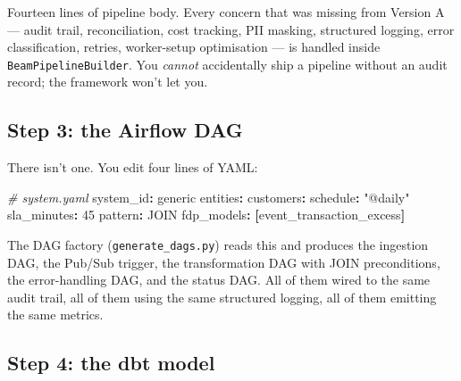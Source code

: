 \documentclass[
  11pt,
  british,
  oneside]{book}
\newenvironment{Shaded}{\begin{snugshade}}{\end{snugshade}}
\newcommand{\AttributeTok}[1]{\textcolor[rgb]{0.77,0.63,0.00}{#1}}
\newcommand{\CommentTok}[1]{\textcolor[rgb]{0.56,0.35,0.01}{\textit{#1}}}
\newcommand{\DecValTok}[1]{\textcolor[rgb]{0.00,0.00,0.81}{#1}}
\newcommand{\FunctionTok}[1]{\textcolor[rgb]{0.00,0.00,0.00}{#1}}
\newcommand{\KeywordTok}[1]{\textcolor[rgb]{0.13,0.29,0.53}{\textbf{#1}}}
\newcommand{\StringTok}[1]{\textcolor[rgb]{0.31,0.60,0.02}{#1}}
\begin{document}
Fourteen lines of pipeline body. Every concern that was missing from
Version A --- audit trail, reconciliation, cost tracking, PII masking,
structured logging, error classification, retries, worker-setup
optimisation --- is handled inside \texttt{BeamPipelineBuilder}. You
\emph{cannot} accidentally ship a pipeline without an audit record; the
framework won't let you.

\hypertarget{step-3-the-airflow-dag}{%
\subsection{Step 3: the Airflow DAG}\label{step-3-the-airflow-dag}}

There isn't one. You edit four lines of YAML:

\begin{Shaded}
\begin{Highlighting}[]
\CommentTok{\# system.yaml}
\FunctionTok{system\_id}\KeywordTok{:}\AttributeTok{ generic}
\FunctionTok{entities}\KeywordTok{:}
\AttributeTok{  }\FunctionTok{customers}\KeywordTok{:}
\AttributeTok{    }\FunctionTok{schedule}\KeywordTok{:}\AttributeTok{ }\StringTok{"@daily"}
\AttributeTok{    }\FunctionTok{sla\_minutes}\KeywordTok{:}\AttributeTok{ }\DecValTok{45}
\AttributeTok{    }\FunctionTok{pattern}\KeywordTok{:}\AttributeTok{ JOIN}
\AttributeTok{    }\FunctionTok{fdp\_models}\KeywordTok{:}\AttributeTok{ }\KeywordTok{[}\AttributeTok{event\_transaction\_excess}\KeywordTok{]}
\end{Highlighting}
\end{Shaded}

The DAG factory (\texttt{generate\_dags.py}) reads this and produces the
ingestion DAG, the Pub/Sub trigger, the transformation DAG with JOIN
preconditions, the error-handling DAG, and the status DAG. All of them
wired to the same audit trail, all of them using the same structured
logging, all of them emitting the same metrics.

\hypertarget{step-4-the-dbt-model}{%
\subsection{Step 4: the dbt model}\label{step-4-the-dbt-model}}
\end{document}
